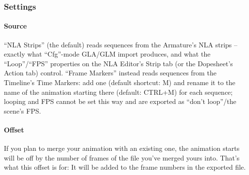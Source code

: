 \documentclass[a4paper,10pt]{article}
\begin{document}
 \subsubsection*{Settings}

 \paragraph*{Source}
 ``NLA Strips'' (the default) reads sequences from the Armature's NLA strips -- exactly what ``Cfg''-mode
 GLA/GLM import produces, and what the ``Loop''/``FPS'' properties on the NLA Editor's Strip tab (or the
 Dopesheet's Action tab) control. ``Frame Markers'' instead reads sequences from the Timeline's Time Markers:
 add one (default shortcut: M) and rename it to the name of the animation starting there (default: CTRL+M)
 for each sequence; looping and FPS cannot be set this way and are exported as ``don't loop''/the scene's FPS.

 \paragraph*{Offset}
 If you plan to merge your animation with an existing one, the animation starts will be off by the number of
 frames of the file you've merged yours into. That's what this offset is for: It will be added to the frame
 numbers in the exported file.
 
 
\end{document}
